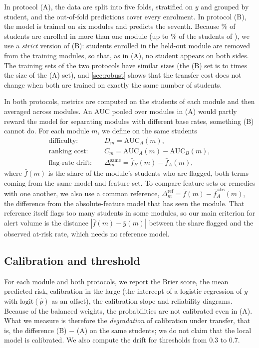 \documentclass[journal]{IEEEtran}
\newcommand{\cA}{(A)}
\newcommand{\cB}{(B)}
\newcommand{\dsame}{\Delta^{\mathrm{same}}}
\newcommand{\dref}{\Delta^{\mathrm{ref}}}
\begin{document}
In protocol \cA, the data are split into five folds, stratified on $y$ and grouped by student, and the out-of-fold predictions cover every enrolment. In protocol \cB, the model is trained on six modules and predicts the seventh. Because \resOverlapStudents\% of students are enrolled in more than one module (up to \resOverlapShareMax\% of the students of \resOverlapShareMaxMod), we use a \emph{strict} version of \cB: students enrolled in the held-out module are removed from the training modules, so that, as in \cA, no student appears on both sides. The training sets of the two protocols have similar sizes (the \cB{} set is \resSizeRatioMin{} to \resSizeRatioMax{} times the size of the \cA{} set), and \cref{sec:robust} shows that the transfer cost does not change when both are trained on exactly the same number of students.

In both protocols, metrics are computed on the students of each module and then averaged across modules. An AUC pooled over modules in \cA{} would partly reward the model for separating modules with different base rates, something \cB{} cannot do. For each module $m$, we define on the same students
\begin{align}
\text{difficulty:}\quad & D_m = \mathrm{AUC}_{A}(m), \\
\text{ranking cost:}\quad & C_m = \mathrm{AUC}_{A}(m) - \mathrm{AUC}_{B}(m), \\
\text{flag-rate drift:}\quad & \dsame_m = \bar{f}_{B}(m) - \bar{f}_{A}(m),
\end{align}
where $\bar{f}(m)$ is the share of the module's students who are flagged, both terms coming from the same model and feature set. To compare feature sets or remedies with one another, we also use a common reference, $\dref_m=\bar{f}(m)-\bar{f}^{\,\mathrm{abs}}_{A}(m)$, the difference from the absolute-feature model that has seen the module. That reference itself flags too many students in some modules, so our main criterion for alert volume is the distance $|\bar{f}(m)-\bar{y}(m)|$ between the share flagged and the observed at-risk rate, which needs no reference model.

\subsection{Calibration and threshold}
For each module and both protocols, we report the Brier score, the mean predicted risk, calibration-in-the-large (the intercept of a logistic regression of $y$ with $\mathrm{logit}(\hat{p})$ as an offset), the calibration slope and reliability diagrams. Because of the balanced weights, the probabilities are not calibrated even in \cA. What we measure is therefore the \emph{degradation} of calibration under transfer, that is, the difference \cB{} $-$ \cA{} on the same students; we do not claim that the local model is calibrated. We also compute the drift for thresholds from 0.3 to 0.7.
\end{document}
